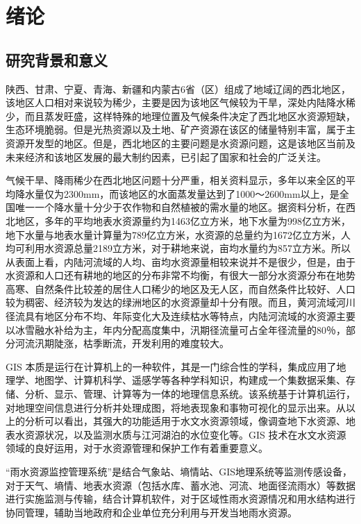 
\chapter{绪论}

\section{研究背景和意义}

陕西、甘肃、宁夏、青海、新疆和内蒙古6省（区）组成了地域辽阔的西北地区，该地区人口相对来说较为稀少，主要是因为该地区气候较为干旱，深处内陆降水稀少，而且蒸发旺盛，这样特殊的地理位置及气候条件决定了西北地区水资源短缺\cite{黄智煌邬娜-2}，生态环境脆弱。但是光热资源以及土地、矿产资源在该区的储量特别丰富，属于主资源开发型的地区。但是，西北地区的主要问题是水资源问题，这是该地区当前及未来经济和该地区发展的最大制约因素，已引起了国家和社会的广泛关注。

气候干旱、降雨稀少在西北地区问题十分严重，相关资料显示，多年以来全区的平均降水量仅为2300mm，而该地区的水面蒸发量达到了1000～2600mm以上，是全国唯一一个降水量十分少于农作物和自然植被的需水量的地区。据资料分析\cite{仇巍巍陈从喜-1}，在西北地区，多年的平均地表水资源量约为1463亿立方米，地下水量为998亿立方米，地下水量与地表水量计算量为789亿立方米，水资源的总量约为1672亿立方米，人均可利用水资源总量2189立方米，对于耕地来说，亩均水量约为857立方米。所以从表面上看，内陆河流域的人均、亩均水资源量相较来说并不是很少，但是，由于水资源和人口还有耕地的地区的分布非常不均衡，有很大一部分水资源分布在地势高寒、自然条件比较差的居住人口稀少的地区及无人区，而自然条件比较好、人口较为稠密、经济较为发达的绿洲地区的水资源量却十分有限。而且，黄河流域河川径流具有地区分布不均、年际变化大及连续枯水等特点，内陆河流域的水资源主要以冰雪融水补给为主，年内分配高度集中，汛期径流量可占全年径流量的80％，部分河流汛期陡涨，枯季断流，开发利用的难度较大。


GIS 本质是运行在计算机上的一种软件，其是一门综合性的学科，集成应用了地理学、地图学、计算机科学、遥感学等各种学科知识，构建成一个集数据采集、存储、分析、显示、管理、计算等为一体的地理信息系统\cite{张国治韩景琦-3}。该系统基于计算机运行，对地理空间信息进行分析并处理成图，将地表现象和事物可视化的显示出来。从以上的分析可以看出，其强大的功能适用于水文水资源领域，像调查地下水资源、地表水资源状况，以及监测水质与江河湖泊的水位变化等。GIS 技术在水文水资源领域的良好运用，对于水资源管理和保护工作有着重要意义。

“雨水资源监控管理系统”是结合气象站、墒情站、GIS地理系统等监测传感设备\cite{郭明华-4}，对于天气、墒情、地表水资源（包括水库、蓄水池、河流、地面径流雨水）等数据进行实施监测与传输，结合计算机软件，对于区域性雨水资源情况和用水结构进行协同管理，辅助当地政府和企业单位充分利用与开发当地雨水资源。

